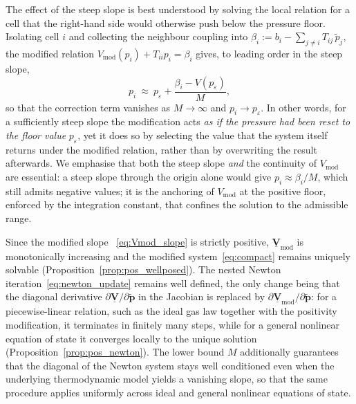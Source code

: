 \documentclass[a4paper,fleqn]{cas-sc}
\theoremstyle{definition}
\theoremstyle{remark}
\begin{document}
The effect of the steep slope is best understood by solving the local relation for a
cell that the right-hand side would otherwise push below the pressure floor. Isolating cell $i$
and collecting the neighbour coupling into
$\beta_i:=b_i-\sum_{j\neq i}T_{ij}\,\tilde{p}_j$, the modified relation
$V_{\mathrm{mod}}(p_i)+T_{ii}p_i=\beta_i$ gives, to leading order in the steep slope,
\begin{equation}
\label{eq:penalty}
p_{i}\ \approx\ p_{\varepsilon}+\frac{\beta_i-V(p_{\varepsilon})}{M},
\end{equation}
so that the correction term vanishes as $M\to\infty$ and $p_i\to p_{\varepsilon}$.
In other words, for a sufficiently steep slope the modification acts \emph{as if the
pressure had been reset to the floor value} $p_{\varepsilon}$, yet it does so by
selecting the value that the system itself returns under the modified relation, rather
than by overwriting the result afterwards. We emphasise that both the steep slope
\emph{and} the continuity of $V_{\mathrm{mod}}$ are essential: a steep slope through the
origin alone would give $p_i\approx\beta_i/M$, which still admits negative values; it is
the anchoring of $V_{\mathrm{mod}}$ at the positive floor, enforced by the integration
constant, that confines the solution to the admissible range.



Since the modified slope ~\eqref{eq:Vmod_slope} is strictly positive,
$\underline{\mathbf V}_{\mathrm{mod}}$ is monotonically increasing and the
modified system~\eqref{eq:compact} remains uniquely solvable (Proposition~\ref{prop:pos_wellposed}). The nested
Newton iteration~\eqref{eq:newton_update} remains well defined, the only change being that the
diagonal derivative $\partial\underline{\mathbf V}/\partial\tilde{\mathbf p}$
in the Jacobian is replaced by
$\partial\underline{\mathbf V}_{\mathrm{mod}}/\partial\tilde{\mathbf p}$: for
a piecewise-linear relation, such as the ideal gas law together with the positivity modification, it terminates in finitely many steps, while for a
general nonlinear equation of state it converges locally to the unique
solution (Proposition~\ref{prop:pos_newton}). The lower bound $M$ additionally guarantees that
the diagonal of the Newton system stays well conditioned even when the
underlying thermodynamic model yields a vanishing slope, so that the same
procedure applies uniformly across ideal and general nonlinear equations of
state.
\end{document}
